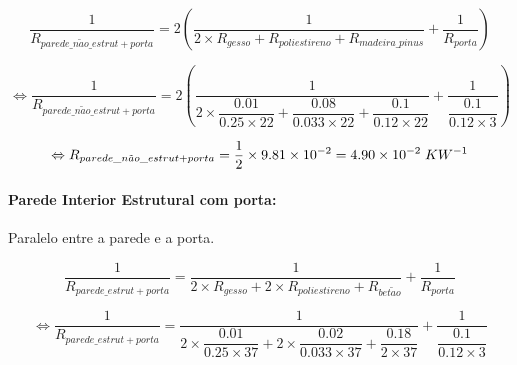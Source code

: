 \documentclass[12pt, a4paper]{article}
\begin{document}
\begin{equation}
    \dfrac{1}{R_{parede\_n\tilde{a}o\_estrut + porta}} = 2 \left(
        \dfrac{1}{
            2 \times R_{gesso} + R_{poliestireno} + R_{madeira\_pinus}
        }
        +
        \dfrac{1}{
            R_{porta}
        }
    \right)
    \label{eq:zona_d_int_n_est_1}
\end{equation}

\begin{equation}
    \Leftrightarrow \dfrac{1}{R_{parede\_n\tilde{a}o\_estrut + porta}} = 2 \left(
        \dfrac{1}{
            2 \times \dfrac{0.01}{0.25 \times 22} +
            \dfrac{0.08}{0.033 \times 22} +
            \dfrac{0.1}{0.12 \times 22}
        }
        +
        \dfrac{1}{
            \dfrac{0.1}{0.12 \times 3}
        }
    \right)
    \label{eq:zona_d_int_n_est_2}
\end{equation}

\begin{equation}
    \Leftrightarrow R_{parede\_n\tilde{a}o\_estrut + porta} =
        \dfrac{1}{2} \times 9.81 \times 10^{-2} = 4.90 \times 10^{-2} \hspace{1mm} KW^{-1}
    \label{eq:zona_d_int_n_est_3}
\end{equation}


\paragraph{Parede Interior Estrutural com porta:}\label{par:zona_d_int_est}Paralelo entre a parede e a porta.

\begin{equation}
    \dfrac{1}{R_{parede\_estrut + porta}} =
        \dfrac{1}{
            2 \times R_{gesso} + 2 \times R_{poliestireno} + R_{bet\tilde{a}o}
        }
        +
        \dfrac{1}{
            R_{porta}
        }
    \label{eq:zona_d_int_est_1}
\end{equation}

\begin{equation}
    \Leftrightarrow \dfrac{1}{R_{parede\_estrut + porta}} =
        \dfrac{1}{
            2 \times \dfrac{0.01}{0.25 \times 37} +
            2 \times \dfrac{0.02}{0.033 \times 37} +
            \dfrac{0.18}{2 \times 37}
        }
        +
        \dfrac{1}{
            \dfrac{0.1}{0.12 \times 3}
        }
    \label{eq:zona_d_int_est_2}
\end{equation}
\end{document}
